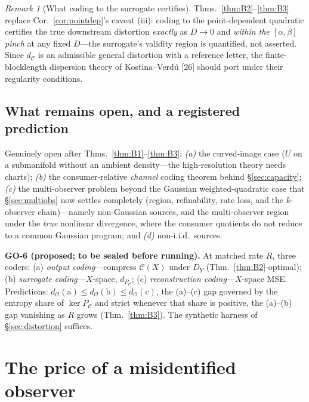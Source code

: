 \documentclass[lettersize,onecolumn]{IEEEtran}
\theoremstyle{definition}
\theoremstyle{remark}
\newtheorem*{remark}{Remark}
\newcommand{\PC}{P_{\mathcal{C}}}
\newcommand{\dO}{d_{\mathcal{O}}}
\begin{document}
\begin{remark}[What coding to the surrogate certifies]
Thms.~\ref{thm:B2}--\ref{thm:B3} replace Cor.~\ref{cor:pointdep}'s caveat (iii): coding
to the point-dependent quadratic certifies the true downstream distortion \emph{exactly}
as $D\to0$ and \emph{within the $[\alpha,\beta]$ pinch} at any fixed $D$---the
surrogate's validity region is quantified, not asserted. Since $d_{\mathcal{C}}$ is an
admissible general distortion with a reference letter, the finite-blocklength dispersion
theory of Kostina--Verd\'u [26] should port under their regularity
conditions.
\end{remark}

\subsection{What remains open, and a registered prediction}\label{subsec:open}

Genuinely open after Thms.~\ref{thm:B1}--\ref{thm:B3}: \emph{(a)} the curved-image case
($U$ on a submanifold without an ambient density---the high-resolution theory needs
charts); \emph{(b)} the consumer-relative \emph{channel} coding theorem behind
\S\ref{sec:capacity}; \emph{(c)} the multi-observer problem beyond the Gaussian weighted-quadratic case that
\S\ref{sec:multiobs} now settles completely (region, refinability, rate loss, and the
$k$-observer chain)---namely non-Gaussian sources, and the multi-observer region under the
\emph{true} nonlinear divergence, where the consumer quotients do not reduce to a common
Gaussian program; and
\emph{(d)} non-i.i.d.\ sources.

\smallskip\noindent\textbf{GO-6 (proposed; to be sealed before running).} At matched
rate $R$, three coders: (a) \emph{output coding}---compress $\mathcal{C}(X)$ under $D_Y$
(Thm.~\ref{thm:B2}-optimal); (b) \emph{surrogate coding}---$X$-space, $d_{\PC}$;
(c) \emph{reconstruction coding}---$X$-space MSE. Predictions:
$\dO(\mathrm a)\le\dO(\mathrm b)\le\dO(\mathrm c)$, the (a)--(c) gap governed by the
entropy share of $\ker\PC$ and strict whenever that share is positive, the (a)--(b) gap
vanishing as $R$ grows (Thm.~\ref{thm:B3}). The synthetic harness of
\S\ref{sec:distortion} suffices.

\section{The price of a misidentified observer}\label{app:mismatch}
\end{document}

